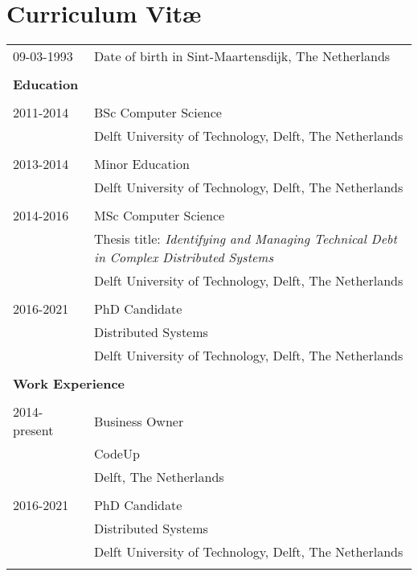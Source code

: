 \chapter*{Curriculum Vit\ae}

\makeatletter
\authors{\@firstname\ {\titleshape\@lastname}}
\makeatother

\noindent
\begin{longtable}{p{} p{}}
    09-03-1993 & Date of birth in Sint-Maartensdijk, The Netherlands \\\\
    
    \large{\textbf{Education}} & \\\\
    2011-2014 & BSc Computer Science\\
    & Delft University of Technology, Delft, The Netherlands \\\\
    
    2013-2014 & Minor Education\\
    & Delft University of Technology, Delft, The Netherlands\\\\
    
    2014-2016 & MSc Computer Science\\
    & Thesis title: \emph{Identifying and Managing Technical Debt in Complex Distributed Systems}\\
    & Delft University of Technology, Delft, The Netherlands\\\\
    
    2016-2021 & PhD Candidate\\
    & Distributed Systems\\
    & Delft University of Technology, Delft, The Netherlands\\\\
    
    \multicolumn{2}{l}{\large{\textbf{Work Experience}}}\\\\
    
    2014-present & Business Owner\\
    & CodeUp\\
    & Delft, The Netherlands\\\\
    
    2016-2021 & PhD Candidate\\
    & Distributed Systems\\
    & Delft University of Technology, Delft, The Netherlands\\\\
\end{longtable}
